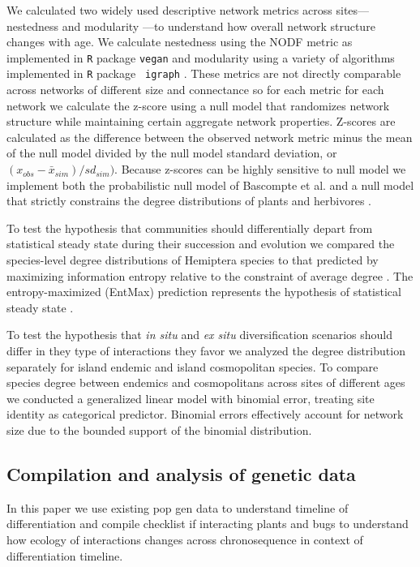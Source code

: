 \documentclass[12pt]{article}
\begin{document}
We calculated two widely used descriptive network metrics across
sites---nestedness \citep{Bascompte2003, Ulrich2009} and modularity
\citep{Newman2004, Olesen2007}---to understand how overall network
structure changes with age.
We calculate nestedness using the NODF metric \citep{nodf} as
implemented in {\tt R} package {\tt vegan} \citep{vegan} and modularity
using a variety of algorithms implemented in {\tt R} package {\tt
  igraph} \citep{igraph}. These metrics are not directly comparable
across networks of different size and connectance \citep{Ulrich2009,
  XXXX} so for each metric for each network we calculate the z-score
using a null model that randomizes network structure while maintaining
certain aggregate network properties. Z-scores are calculated as the
difference between the observed network metric minus the mean of the
null model divided by the null model standard deviation, or $(x_{obs}
- \bar{x}_{sim}) / sd_{sim})$. Because z-scores can be highly
sensitive to null model \citep{Ulrich2009} we implement both the
probabilistic null model of Bascompte et al. \citep{Bascompte2003} and
a null model that strictly constrains the degree distributions of
plants and herbivores \citep{Ulrich2009}.

To test the hypothesis that communities should differentially depart
from statistical steady state during their succession and evolution we
compared the species-level degree distributions of Hemiptera species
to that predicted by maximizing information entropy relative to the
constraint of average degree \citep{williams2010}. The
entropy-maximized (EntMax) prediction represents the hypothesis of
statistical steady state \citep{harte2011}.

To test the hypothesis that {\it in situ} and {\it ex situ}
diversification scenarios should differ in they type of interactions
they favor we analyzed the degree distribution separately for island
endemic and island cosmopolitan species. To compare species degree
between endemics and cosmopolitans across sites of different ages we
conducted a generalized linear model with binomial error, treating
site identity as categorical predictor. Binomial errors effectively
account for network size due to the bounded support of the binomial
distribution.

\subsection*{Compilation and analysis of genetic data}
In this paper we use existing pop gen data to understand timeline of
differentiation and compile checklist if interacting plants and bugs
to understand how ecology of interactions changes across
chronosequence in context of differentiation timeline.
\end{document}
